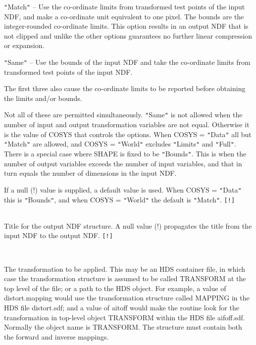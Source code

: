 \documentclass[twoside,11pt]{article}
\newcommand{\sstsubsection}[1]{ \item[{#1}] \mbox{} \\}
\newcommand{\sstitem}{\item}
\newcommand{\sstsubsection}[1]{\item[{#1}]}
\begin{document}
{{{{            \sstitem
            {\tt "}Match{\tt "}  -- Use the co-ordinate limits from transformed test
                           points of the input NDF, and make a co-ordinate
                           unit equivalent to one pixel.  The bounds are the
                           integer-rounded co-ordinate limits.  This option
                           results in an output NDF that is not clipped and
                           unlike the other options guarantees no further
                           linear compression or expansion.

            \sstitem
            {\tt "}Same{\tt "}   -- Use the bounds of the input NDF and take the
                           co-ordinate limits from transformed test points
                           of the input NDF.

         }
         The first three also cause the co-ordinate limits to be
         reported before obtaining the limits and/or bounds.

         Not all of these are permitted simultaneously.  {\tt "}Same{\tt "} is not
         allowed when the number of input and output transformation
         variables are not equal.  Otherwise it is the value of
         COSYS that controls the options.  When COSYS = {\tt "}Data{\tt "} all but
         {\tt "}Match{\tt "} are allowed, and COSYS = {\tt "}World{\tt "} excludes {\tt "}Limits{\tt "} and
         {\tt "}Full{\tt "}.  There is a special case where SHAPE is fixed to be
         {\tt "}Bounds{\tt "}.  This is when the number of output variables exceeds
         the number of input variables, and that in turn equals the
         number of dimensions in the input NDF.

         If a null (!) value is supplied, a default value is used. When
         COSYS = {\tt "}Data{\tt "} this is {\tt "}Bounds{\tt "}, and when COSYS = {\tt "}World{\tt "} the
         default is {\tt "}Match{\tt "}.  {\tt [!]}
      }
      \sstsubsection{
         TITLE = LITERAL (Read)
      }{
         Title for the output NDF structure.  A null value (!)
         propagates the title from the input NDF to the output NDF. {\tt [!]}
      }
      \sstsubsection{
         TRANSFORM = TRN (Read)
      }{
         The transformation to be applied.  This may be an HDS
         container file, in which case the transformation structure is
         assumed to be called TRANSFORM at the top level of the file;
         or a path to the HDS object.  For example, a value of
         distort.mapping would use the transformation structure called
         MAPPING in the HDS file distort.sdf; and a value of aitoff
         would make the routine look for the transformation in top-level
         object TRANSFORM within the HDS file aifoff.sdf.  Normally the
         object name is TRANSFORM.  The structure must contain both the
         forward and inverse mappings.

}}}
\end{document}
